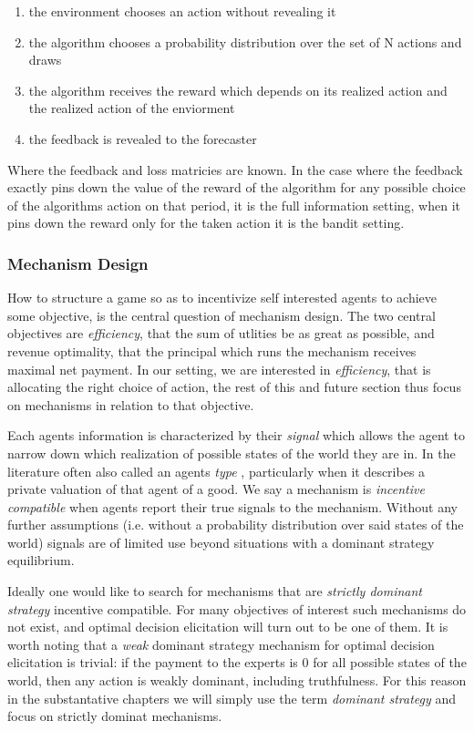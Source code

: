 \begin{enumerate}
\item the environment chooses an action without revealing it
\item the algorithm chooses a probability distribution over the set of N actions and draws
\item the algorithm receives the reward which depends on its realized action and the realized action of the enviorment
\item the feedback is revealed to the forecaster
\end{enumerate}

Where the feedback and loss matricies are known. In the case where the feedback exactly pins down the value of the reward of the algorithm for any possible choice of the algorithms action on that period, it is the full information setting, when it pins down the reward only for the taken action it is the bandit setting.


\subsubsection{Mechanism Design}

How to structure a game so as to incentivize self interested agents to achieve some objective, is the central question of mechanism design.
The two central objectives are \emph{efficiency}, that the sum of utlities be as great as possible, and revenue optimality, that the principal which runs the mechanism receives maximal net payment.
In our setting, we are interested in \emph{efficiency}, that is allocating the right choice of action, the rest of this and future section thus focus on mechanisms in relation to that objective.

Each agents information is characterized by their \emph{signal} which allows the agent to narrow down which realization of possible states of the world they are in. In the literature often also called an agents \emph{type} , particularly when it describes a private valuation of that agent of a good.
We say a mechanism is \emph{incentive compatible} when agents report their true signals to the mechanism. 
Without any further assumptions (i.e. without a probability distribution over said states of the world) signals are of limited use beyond situations with a dominant strategy equilibrium.

Ideally one would like to search for mechanisms that are  \emph{strictly dominant strategy} incentive compatible.
For many objectives of interest such mechanisms do not exist, and optimal decision elicitation will turn out to be one of them. 
It is worth noting that a \emph{weak} dominant strategy mechanism for optimal decision elicitation is trivial: if the payment to the experts is 0 for all possible states of the world, then any action is weakly dominant, including truthfulness. 
For this reason in the substantative chapters we will simply use the term \emph{dominant strategy} and focus on strictly dominat mechanisms. 


